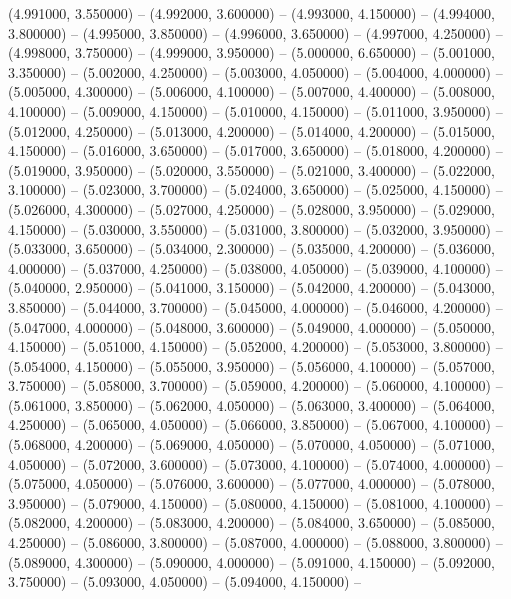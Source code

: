 (4.991000, 3.550000) -- 
(4.992000, 3.600000) -- 
(4.993000, 4.150000) -- 
(4.994000, 3.800000) -- 
(4.995000, 3.850000) -- 
(4.996000, 3.650000) -- 
(4.997000, 4.250000) -- 
(4.998000, 3.750000) -- 
(4.999000, 3.950000) -- 
(5.000000, 6.650000) -- 
(5.001000, 3.350000) -- 
(5.002000, 4.250000) -- 
(5.003000, 4.050000) -- 
(5.004000, 4.000000) -- 
(5.005000, 4.300000) -- 
(5.006000, 4.100000) -- 
(5.007000, 4.400000) -- 
(5.008000, 4.100000) -- 
(5.009000, 4.150000) -- 
(5.010000, 4.150000) -- 
(5.011000, 3.950000) -- 
(5.012000, 4.250000) -- 
(5.013000, 4.200000) -- 
(5.014000, 4.200000) -- 
(5.015000, 4.150000) -- 
(5.016000, 3.650000) -- 
(5.017000, 3.650000) -- 
(5.018000, 4.200000) -- 
(5.019000, 3.950000) -- 
(5.020000, 3.550000) -- 
(5.021000, 3.400000) -- 
(5.022000, 3.100000) -- 
(5.023000, 3.700000) -- 
(5.024000, 3.650000) -- 
(5.025000, 4.150000) -- 
(5.026000, 4.300000) -- 
(5.027000, 4.250000) -- 
(5.028000, 3.950000) -- 
(5.029000, 4.150000) -- 
(5.030000, 3.550000) -- 
(5.031000, 3.800000) -- 
(5.032000, 3.950000) -- 
(5.033000, 3.650000) -- 
(5.034000, 2.300000) -- 
(5.035000, 4.200000) -- 
(5.036000, 4.000000) -- 
(5.037000, 4.250000) -- 
(5.038000, 4.050000) -- 
(5.039000, 4.100000) -- 
(5.040000, 2.950000) -- 
(5.041000, 3.150000) -- 
(5.042000, 4.200000) -- 
(5.043000, 3.850000) -- 
(5.044000, 3.700000) -- 
(5.045000, 4.000000) -- 
(5.046000, 4.200000) -- 
(5.047000, 4.000000) -- 
(5.048000, 3.600000) -- 
(5.049000, 4.000000) -- 
(5.050000, 4.150000) -- 
(5.051000, 4.150000) -- 
(5.052000, 4.200000) -- 
(5.053000, 3.800000) -- 
(5.054000, 4.150000) -- 
(5.055000, 3.950000) -- 
(5.056000, 4.100000) -- 
(5.057000, 3.750000) -- 
(5.058000, 3.700000) -- 
(5.059000, 4.200000) -- 
(5.060000, 4.100000) -- 
(5.061000, 3.850000) -- 
(5.062000, 4.050000) -- 
(5.063000, 3.400000) -- 
(5.064000, 4.250000) -- 
(5.065000, 4.050000) -- 
(5.066000, 3.850000) -- 
(5.067000, 4.100000) -- 
(5.068000, 4.200000) -- 
(5.069000, 4.050000) -- 
(5.070000, 4.050000) -- 
(5.071000, 4.050000) -- 
(5.072000, 3.600000) -- 
(5.073000, 4.100000) -- 
(5.074000, 4.000000) -- 
(5.075000, 4.050000) -- 
(5.076000, 3.600000) -- 
(5.077000, 4.000000) -- 
(5.078000, 3.950000) -- 
(5.079000, 4.150000) -- 
(5.080000, 4.150000) -- 
(5.081000, 4.100000) -- 
(5.082000, 4.200000) -- 
(5.083000, 4.200000) -- 
(5.084000, 3.650000) -- 
(5.085000, 4.250000) -- 
(5.086000, 3.800000) -- 
(5.087000, 4.000000) -- 
(5.088000, 3.800000) -- 
(5.089000, 4.300000) -- 
(5.090000, 4.000000) -- 
(5.091000, 4.150000) -- 
(5.092000, 3.750000) -- 
(5.093000, 4.050000) -- 
(5.094000, 4.150000) -- 
